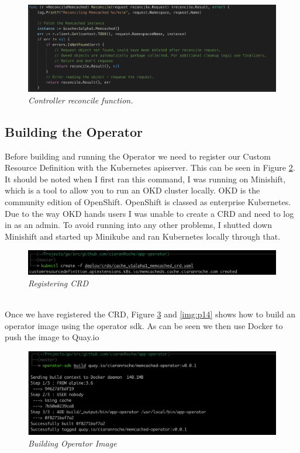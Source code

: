 \begin{figure}[!ht]
\centering
\includegraphics*[width=1\textwidth]{images/p11.png}
\caption{\em Controller reconcile function.}
\label{img:p11}
\end{figure}


\subsection{Building the Operator}
\label{sub:buildop}
Before building and running the Operator we need to register our Custom Resource Definition with the Kubernetes apiserver. This can be seen in Figure \ref{img:p12}. It should be noted when I first ran this command, I was running on Minishift, which is a tool to allow you to run an OKD cluster locally. OKD is the community edition of OpenShift. OpenShift is classed as enterprise Kubernetes. Due to the way OKD hands users I was unable to create a CRD and need to log in as an admin. To avoid running into any other problems, I shutted down Minishift and started up Minikube and ran Kubernetes locally through that.
\begin{figure}[!ht]
\centering
\includegraphics*[width=1\textwidth]{images/p12.png}
\caption{\em Registering CRD}
\label{img:p12}
\end{figure}
\\Once we have registered the CRD, Figure \ref{img:p13} and \ref{img:p14} shows how to build an operator image using the operator sdk. As can be seen we then use Docker to push the image to Quay.io
\begin{figure}[!ht]
\centering
\includegraphics*[width=1\textwidth]{images/p13.png}
\caption{\em Building Operator Image}
\label{img:p13}
\end{figure}

